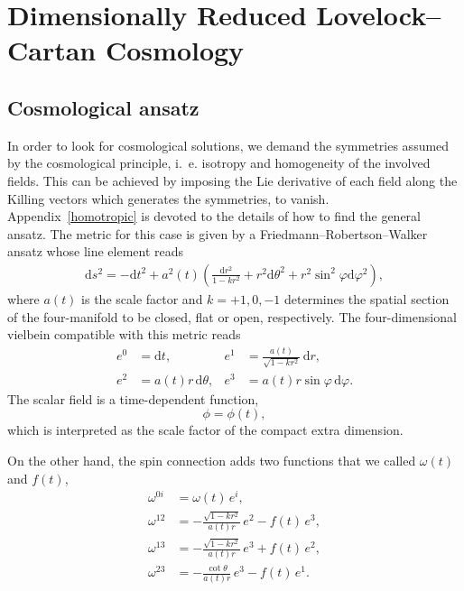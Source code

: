 \documentclass[aps,prd,12pt,superscriptaddress,showpacs,showkeys,reprint,nofootinbib]{revtex4-1}
\begin{document}
\section{Dimensionally Reduced Lovelock--Cartan Cosmology\label{cosmos}}

\subsection{Cosmological ansatz}

In order to look for cosmological solutions, we demand the symmetries assumed by the cosmological principle, i.~e. isotropy and homogeneity of the involved fields. This can be achieved by imposing the Lie derivative of each field along the Killing vectors which generates the symmetries, to vanish. Appendix~\ref{homotropic} is devoted to the details of how to find the general ansatz.
The metric for this case is given by a Friedmann--Robertson--Walker ansatz whose line element reads
\begin{align*}
\text{d}s^2=-\text{d}t^2+a^2(t)\left(\frac{\text{d}r^2}{1-kr^2}+r^2\text{d}\theta^2+r^2\sin^2\varphi\text{d}\varphi^2\right),
\end{align*}
where $a(t)$ is the scale factor and $k=+1,0,-1$ determines the spatial section of the four-manifold to be closed, flat or open, respectively. The four-dimensional vielbein compatible with this metric reads
\begin{equation}
  \begin{aligned}
    \label{vielbein cosmo}
    e^0&=\mbox{d}t, & e^1&=\frac{a(t)}{\sqrt{1-kr^2}} \, \mbox{d}r,\\
    e^2&=a(t)r \, \mbox{d}\theta, & e^3&=a(t) r \sin\varphi \,\mbox{d}\varphi.
  \end{aligned}
\end{equation}
The scalar field is a time-dependent function, 
\begin{equation}
  \phi=\phi(t),
\end{equation}
which is interpreted as the scale factor of the compact extra dimension.

On the other hand, the spin connection adds two functions that we called $\omega(t)$ and $f(t)$,
\begin{align}
  \omega^{0i}&=\omega(t) \, e^i,\\
  \omega^{12}&=-\frac{\sqrt{1-kr^2}}{a(t)r} \, e^2 - f(t) \, e^3,\\
  \omega^{13}&=-\frac{\sqrt{1-kr^2}}{a(t)r} \, e^3 + f(t) \, e^2,\\
  \omega^{23}&=-\frac{\cot\theta}{a(t)r} \, e^3 - f(t) \, e^1.
\end{align}
\end{document}
